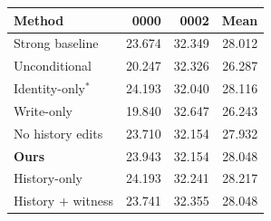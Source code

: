 \begin{tabular}{lrrr}
\toprule
Method & 0000 & 0002 & Mean \\
\midrule
Strong baseline & 23.674 & 32.349 & 28.012 \\
Unconditional & 20.247 & 32.326 & 26.287 \\
Identity-only$^*$ & 24.193 & 32.040 & 28.116 \\
Write-only & 19.840 & 32.647 & 26.243 \\
No history edits & 23.710 & 32.154 & 27.932 \\
\textbf{Ours} & 23.943 & 32.154 & 28.048 \\
History-only & 24.193 & 32.241 & 28.217 \\
History + witness & 23.741 & 32.355 & 28.048 \\
\bottomrule
\end{tabular}
